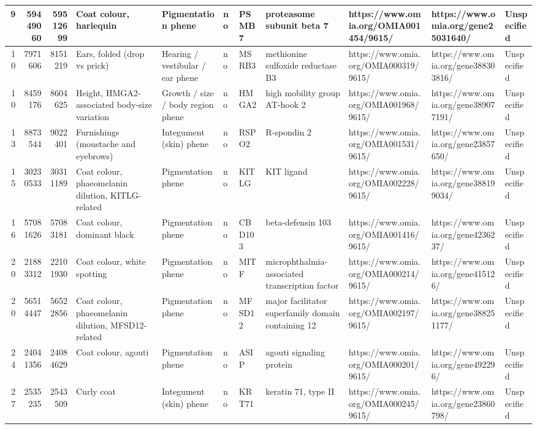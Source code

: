 \documentclass[
]{article}
\begin{document}
\begin{table}
\begin{tabular}[t]{r|r|r|l|l|l|l|l|l|l|l}
\hline
9 & 59449060 & 59512699 & Coat colour, harlequin & Pigmentation phene & no & PSMB7 & proteasome subunit beta 7 & https://www.omia.org/OMIA001454/9615/ & https://www.omia.org/gene25031640/ & Unspecified\\
\hline
10 & 7971606 & 8151219 & Ears, folded (drop vs prick) & Hearing / vestibular / ear phene & no & MSRB3 & methionine sulfoxide reductase B3 & https://www.omia.org/OMIA000319/9615/ & https://www.omia.org/gene388303816/ & Unspecified\\
\hline
10 & 8459176 & 8604625 & Height, HMGA2-associated body-size variation & Growth / size / body region phene & no & HMGA2 & high mobility group AT-hook 2 & https://www.omia.org/OMIA001968/9615/ & https://www.omia.org/gene389077191/ & Unspecified\\
\hline
13 & 8873544 & 9022401 & Furnishings (moustache and eyebrows) & Integument (skin) phene & no & RSPO2 & R-spondin 2 & https://www.omia.org/OMIA001531/9615/ & https://www.omia.org/gene23857650/ & Unspecified\\
\hline
15 & 30230533 & 30311189 & Coat colour, phaeomelanin dilution, KITLG-related & Pigmentation phene & no & KITLG & KIT ligand & https://www.omia.org/OMIA002228/9615/ & https://www.omia.org/gene388199034/ & Unspecified\\
\hline
16 & 57081626 & 57083181 & Coat colour, dominant black & Pigmentation phene & no & CBD103 & beta-defensin 103 & https://www.omia.org/OMIA001416/9615/ & https://www.omia.org/gene4236237/ & Unspecified\\
\hline
20 & 21883312 & 22101930 & Coat colour, white spotting & Pigmentation phene & no & MITF & microphthalmia-associated transcription factor & https://www.omia.org/OMIA000214/9615/ & https://www.omia.org/gene415126/ & Unspecified\\
\hline
20 & 56514447 & 56522856 & Coat colour, phaeomelanin dilution, MFSD12-related & Pigmentation phene & no & MFSD12 & major facilitator superfamily domain containing 12 & https://www.omia.org/OMIA002197/9615/ & https://www.omia.org/gene388251177/ & Unspecified\\
\hline
24 & 24041356 & 24084629 & Coat colour, agouti & Pigmentation phene & no & ASIP & agouti signaling protein & https://www.omia.org/OMIA000201/9615/ & https://www.omia.org/gene492296/ & Unspecified\\
\hline
27 & 2535235 & 2543509 & Curly coat & Integument (skin) phene & no & KRT71 & keratin 71, type II & https://www.omia.org/OMIA000245/9615/ & https://www.omia.org/gene23860798/ & Unspecified\\

\end{tabular}
\end{table}
\end{document}
